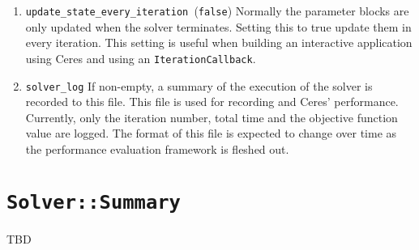 \begin{enumerate}
\item{\texttt{update\_state\_every\_iteration }}(\texttt{false})
Normally the parameter blocks are only updated when the solver
terminates. Setting this to true update them in every iteration. This
setting is useful when building an interactive application using Ceres
and using an \texttt{IterationCallback}.

\item{\texttt{solver\_log}}  If non-empty, a summary of the execution of the solver is
 recorded to this file.  This file is used for recording and Ceres'
 performance. Currently, only the iteration number, total
 time and the objective function value are logged. The format of this
 file is expected to change over time as the performance evaluation
 framework is fleshed out.
\end{enumerate}

\section{\texttt{Solver::Summary}}
TBD
